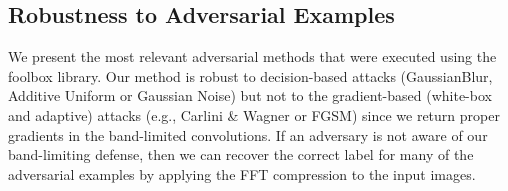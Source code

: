 


\subsection{Robustness to Adversarial Examples}
We present the most relevant adversarial methods that were executed using the foolbox library. Our method is robust to decision-based attacks (GaussianBlur, Additive Uniform or Gaussian Noise) but not to the gradient-based (white-box and adaptive) attacks (e.g., Carlini \& Wagner or FGSM) since we return proper gradients in the band-limited convolutions. If an adversary is not aware of our band-limiting defense, then we can recover the correct label for many of the adversarial examples by applying the FFT compression to the input images.

